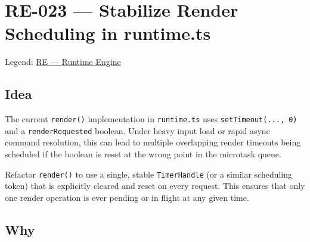 \chapter{RE-023 --- Stabilize Render Scheduling in runtime.ts}\label{record-378}

\smallskip

Legend: \href{https://github.com/flyingrobots/bijou/blob/cbd70612140e7a450d764b3c7be1c6af878b99bc/docs/method/graveyard/legends/RE-runtime-engine.md}{RE --- Runtime Engine}

\section{Idea}\label{record-378-idea}

The current \texttt{r\allowbreak{}e\allowbreak{}n\allowbreak{}d\allowbreak{}e\allowbreak{}r\allowbreak{}(\allowbreak{})} implementation in \texttt{r\allowbreak{}u\allowbreak{}n\allowbreak{}t\allowbreak{}i\allowbreak{}m\allowbreak{}e\allowbreak{}.\allowbreak{}t\allowbreak{}s} uses \texttt{s\allowbreak{}e\allowbreak{}t\allowbreak{}T\allowbreak{}i\allowbreak{}m\allowbreak{}e\allowbreak{}o\allowbreak{}u\allowbreak{}t\allowbreak{}(\allowbreak{}.\allowbreak{}.\allowbreak{}.\allowbreak{},\allowbreak{} \allowbreak{}0\allowbreak{})} and a \texttt{r\allowbreak{}e\allowbreak{}n\allowbreak{}d\allowbreak{}e\allowbreak{}r\allowbreak{}R\allowbreak{}e\allowbreak{}q\allowbreak{}u\allowbreak{}e\allowbreak{}s\allowbreak{}t\allowbreak{}e\allowbreak{}d} boolean. Under heavy input load or rapid async command resolution, this can lead to multiple overlapping render timeouts being scheduled if the boolean is reset at the wrong point in the microtask queue.

Refactor \texttt{r\allowbreak{}e\allowbreak{}n\allowbreak{}d\allowbreak{}e\allowbreak{}r\allowbreak{}(\allowbreak{})} to use a single, stable \texttt{T\allowbreak{}i\allowbreak{}m\allowbreak{}e\allowbreak{}r\allowbreak{}H\allowbreak{}a\allowbreak{}n\allowbreak{}d\allowbreak{}l\allowbreak{}e} (or a similar scheduling token) that is explicitly cleared and reset on every request. This ensures that only one render operation is ever pending or in flight at any given time.

\section{Why}\label{record-378-why}

